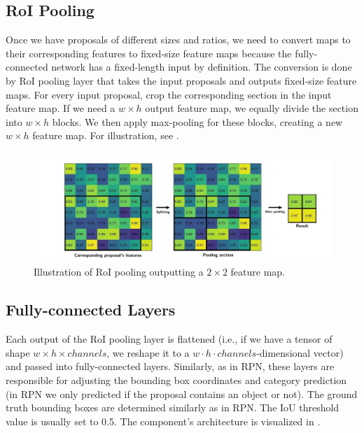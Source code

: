 \subsection{RoI Pooling}
Once we have proposals of different sizes and ratios, we need to convert
maps to their corresponding features to fixed-size feature maps because the
fully-connected network has a fixed-length input by definition. The conversion
is done by RoI pooling layer that takes the input proposals and outputs
fixed-size feature maps.  For every input proposal, crop the corresponding
section in the input feature map. If we need a $w \times h$ output feature
map, we equally divide the section into $w \times h$ blocks. We then apply
max-pooling for these blocks, creating a new $w \times h$ feature map. For
illustration, see .
\begin{figure}[h]
    \centering
    \includegraphics[width=1.05\linewidth]{Sources/Figures/roi.png}
    \caption{Illustration of RoI pooling outputting a $2\times 2$ feature map.
        \cite{roipooling}}
    \label{fig:roipooling}
\end{figure}

\subsection{Fully-connected Layers}
Each output of the RoI pooling layer is flattened (i.e., if we have a
tensor of shape $w \times h\times channels$, we reshape it to a $w \cdot
    h \cdot channels$-dimensional vector) and passed into fully-connected
layers. Similarly, as in RPN, these layers are responsible for adjusting the
bounding box coordinates and category prediction (in RPN we only predicted
if the proposal contains an object or not). The ground truth bounding boxes
are determined similarly as in RPN. The IoU threshold value is usually set
to 0.5. The component's architecture is visualized in .

